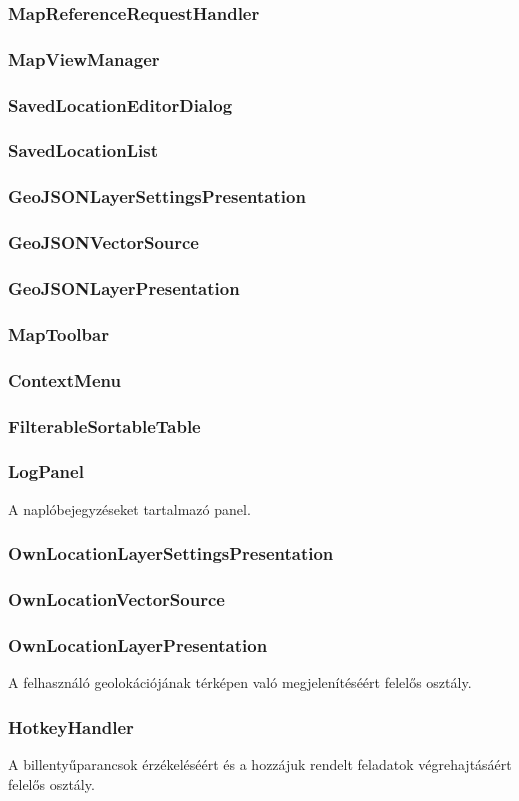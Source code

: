 \subsubsection{MapReferenceRequestHandler}
\subsubsection{MapViewManager}
\subsubsection{SavedLocationEditorDialog}
\subsubsection{SavedLocationList}

\subsubsection{GeoJSONLayerSettingsPresentation}
\subsubsection{GeoJSONVectorSource}
\subsubsection{GeoJSONLayerPresentation}

\subsubsection{MapToolbar}
\subsubsection{ContextMenu}

\subsubsection{FilterableSortableTable}
\subsubsection{LogPanel}

A naplóbejegyzéseket tartalmazó panel.

\subsubsection{OwnLocationLayerSettingsPresentation}
\subsubsection{OwnLocationVectorSource}
\subsubsection{OwnLocationLayerPresentation}

A felhasználó geolokációjának térképen való megjelenítéséért felelős osztály.

\subsubsection{HotkeyHandler}

A billentyűparancsok érzékeléséért és a hozzájuk rendelt feladatok végrehajtásáért felelős osztály.
